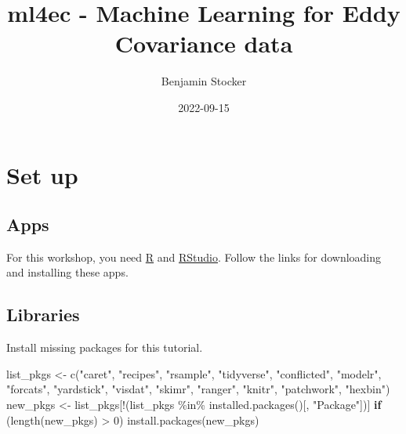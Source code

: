 \documentclass[
]{book}
\title{ml4ec - Machine Learning for Eddy Covariance data}
\author{Benjamin Stocker}
\date{2022-09-15}
\newenvironment{Shaded}{\begin{snugshade}}{\end{snugshade}}
\newcommand{\ControlFlowTok}[1]{\textcolor[rgb]{0.13,0.29,0.53}{\textbf{#1}}}
\newcommand{\DecValTok}[1]{\textcolor[rgb]{0.00,0.00,0.81}{#1}}
\newcommand{\FunctionTok}[1]{\textcolor[rgb]{0.00,0.00,0.00}{#1}}
\newcommand{\NormalTok}[1]{#1}
\newcommand{\OtherTok}[1]{\textcolor[rgb]{0.56,0.35,0.01}{#1}}
\newcommand{\SpecialCharTok}[1]{\textcolor[rgb]{0.00,0.00,0.00}{#1}}
\newcommand{\StringTok}[1]{\textcolor[rgb]{0.31,0.60,0.02}{#1}}
\begin{document}
\maketitle

{
\setcounter{tocdepth}{1}
\tableofcontents
}
\hypertarget{set-up}{%
\chapter{Set up}\label{set-up}}

\hypertarget{apps}{%
\section{Apps}\label{apps}}

For this workshop, you need \href{https://www.r-project.org/}{R} and \href{https://www.rstudio.com/products/rstudio/download/}{RStudio}. Follow the links for downloading and installing these apps.

\hypertarget{libraries}{%
\section{Libraries}\label{libraries}}

Install missing packages for this tutorial.

\begin{Shaded}
\begin{Highlighting}[]
\NormalTok{list\_pkgs }\OtherTok{\textless{}{-}} \FunctionTok{c}\NormalTok{(}\StringTok{"caret"}\NormalTok{, }\StringTok{"recipes"}\NormalTok{, }\StringTok{"rsample"}\NormalTok{, }\StringTok{"tidyverse"}\NormalTok{, }\StringTok{"conflicted"}\NormalTok{, }\StringTok{"modelr"}\NormalTok{, }\StringTok{"forcats"}\NormalTok{, }\StringTok{"yardstick"}\NormalTok{, }\StringTok{"visdat"}\NormalTok{, }\StringTok{"skimr"}\NormalTok{, }\StringTok{"ranger"}\NormalTok{, }\StringTok{"knitr"}\NormalTok{, }\StringTok{"patchwork"}\NormalTok{, }\StringTok{"hexbin"}\NormalTok{)}
\NormalTok{new\_pkgs }\OtherTok{\textless{}{-}}\NormalTok{ list\_pkgs[}\SpecialCharTok{!}\NormalTok{(list\_pkgs }\SpecialCharTok{\%in\%} \FunctionTok{installed.packages}\NormalTok{()[, }\StringTok{"Package"}\NormalTok{])]}
\ControlFlowTok{if}\NormalTok{ (}\FunctionTok{length}\NormalTok{(new\_pkgs) }\SpecialCharTok{\textgreater{}} \DecValTok{0}\NormalTok{) }\FunctionTok{install.packages}\NormalTok{(new\_pkgs)}
\end{Highlighting}
\end{Shaded}
\end{document}
